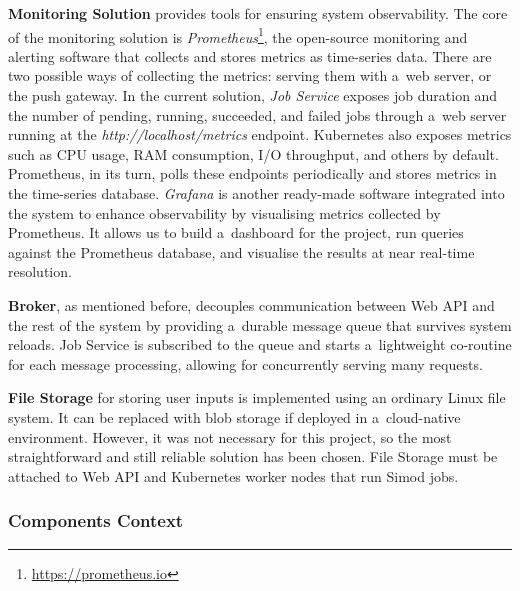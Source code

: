 \documentclass[12pt]{article}
\begin{document}
\textbf{Monitoring Solution} provides tools for ensuring system observability. The core of the monitoring solution is \emph{Prometheus}\footnote{\href{https://prometheus.io}{https://prometheus.io}}, the open-source monitoring and alerting software that collects and stores metrics as time-series data. There are two possible ways of collecting the metrics: serving them with a~web server, or the push gateway. In the current solution, \emph{Job Service} exposes job duration and the number of pending, running, succeeded, and failed jobs through a~web server running at the \emph{http://localhost/metrics} endpoint. Kubernetes also exposes metrics such as CPU usage, RAM consumption, I/O throughput, and others by default. Prometheus, in its turn, polls these endpoints periodically and stores metrics in the time-series database. \emph{Grafana} is another ready-made software integrated into the system to enhance observability by visualising metrics collected by Prometheus. It allows us to build a~dashboard for the project, run queries against the Prometheus database, and visualise the results at near real-time resolution.

\textbf{Broker}, as mentioned before, decouples communication between Web API and the rest of the system by providing a~durable message queue that survives system reloads. Job Service is subscribed to the queue and starts a~lightweight co-routine for each message processing, allowing for concurrently serving many requests.

\textbf{File Storage} for storing user inputs is implemented using an ordinary Linux file system. It can be replaced with blob storage if deployed in a~cloud-native environment. However, it was not necessary for this project, so the most straightforward and still reliable solution has been chosen. File Storage must be attached to Web API and Kubernetes worker nodes that run Simod jobs.

\subsubsection{Components Context}
\end{document}

